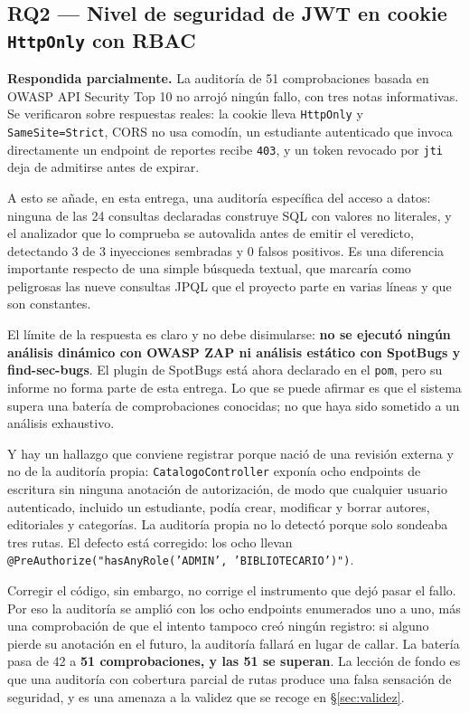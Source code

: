 \documentclass[11pt,a4paper]{article}
\begin{document}
\subsection{RQ2 --- Nivel de seguridad de JWT en cookie \texttt{HttpOnly} con RBAC}

\textbf{Respondida parcialmente.} La auditoría de 51 comprobaciones basada en
OWASP API Security Top 10 no arrojó ningún fallo, con tres notas informativas.
Se verificaron sobre respuestas reales: la cookie lleva \texttt{HttpOnly} y
\texttt{SameSite=Strict}, CORS no usa comodín, un estudiante autenticado que
invoca directamente un endpoint de reportes recibe \texttt{403}, y un token
revocado por \texttt{jti} deja de admitirse antes de expirar.

A esto se añade, en esta entrega, una auditoría específica del acceso a datos:
ninguna de las 24 consultas declaradas construye SQL con valores no literales, y
el analizador que lo comprueba se autovalida antes de emitir el veredicto,
detectando 3 de 3 inyecciones sembradas y 0 falsos positivos. Es una diferencia
importante respecto de una simple búsqueda textual, que marcaría como peligrosas
las nueve consultas JPQL que el proyecto parte en varias líneas y que son
constantes.

El límite de la respuesta es claro y no debe disimularse: \textbf{no se ejecutó
ningún análisis dinámico con OWASP ZAP ni análisis estático con SpotBugs y
find-sec-bugs}. El plugin de SpotBugs está ahora declarado en el \texttt{pom},
pero su informe no forma parte de esta entrega. Lo que se puede afirmar es que
el sistema supera una batería de comprobaciones conocidas; no que haya sido
sometido a un análisis exhaustivo.

Y hay un hallazgo que conviene registrar porque nació de una revisión externa y
no de la auditoría propia: \texttt{CatalogoController} exponía ocho endpoints de
escritura sin ninguna anotación de autorización, de modo que cualquier usuario
autenticado, incluido un estudiante, podía crear, modificar y borrar autores,
editoriales y categorías. La auditoría propia no lo detectó porque solo sondeaba
tres rutas. El defecto está corregido: los ocho llevan
\texttt{@PreAuthorize("hasAnyRole('ADMIN', 'BIBLIOTECARIO')")}.

Corregir el código, sin embargo, no corrige el instrumento que dejó pasar el
fallo. Por eso la auditoría se amplió con los ocho endpoints enumerados uno a
uno, más una comprobación de que el intento tampoco creó ningún registro: si
alguno pierde su anotación en el futuro, la auditoría fallará en lugar de
callar. La batería pasa de 42 a \textbf{51 comprobaciones, y las 51 se superan}.
La lección de fondo es que una auditoría con cobertura parcial de rutas produce
una falsa sensación de seguridad, y es una amenaza a la validez que se recoge en
§\ref{sec:validez}.
\end{document}
